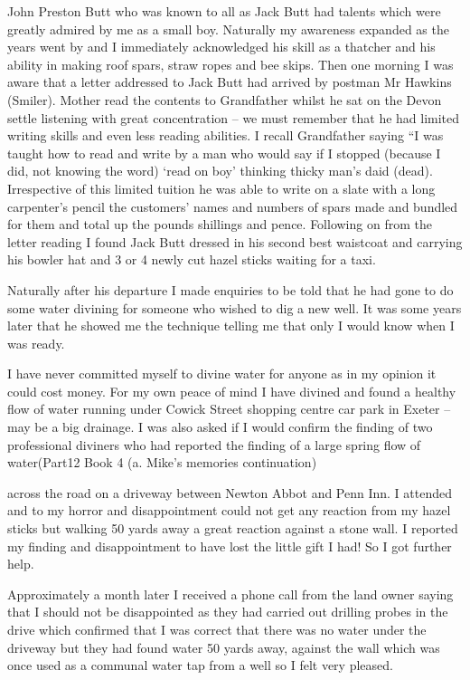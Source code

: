 John Preston Butt who was known to all as Jack Butt had talents which were
greatly admired by me as a small boy.   Naturally my awareness expanded as the
years went by and I immediately acknowledged his skill as a thatcher and his
ability in making roof spars, straw ropes and bee skips.  Then one morning I
was aware that a letter addressed to Jack Butt had arrived by postman Mr
Hawkins (Smiler).  Mother read the contents to Grandfather whilst he sat on the
Devon settle listening with great concentration – we must remember that he had
limited writing skills and even less reading abilities.  I recall Grandfather
saying ``I was taught how to read and write by a man who would say if I
stopped (because I did, not knowing the word) ‘read on boy' thinking thicky
man's daid (dead).  Irrespective of this limited tuition he was able to write
on a slate with a long carpenter's pencil the customers' names and numbers of
spars made and bundled for them and total up the pounds shillings and pence.
Following on from the letter reading I found Jack Butt dressed in his second
best waistcoat and carrying his bowler hat and 3 or 4 newly cut hazel sticks
waiting for a taxi.

Naturally after his departure I made enquiries to be told that he had gone to do
some water divining for someone who wished to dig a new well.  It was some
years later that he showed me the technique telling me that only I would know
when I was ready.

I have never committed myself to divine water for anyone as in my opinion it
could cost money.  For my own peace of mind I have divined and found a healthy
flow of water running under Cowick Street shopping centre car park in Exeter –
may be a big drainage. I was also asked if I would confirm the finding of two
professional diviners who had reported the finding of a large spring flow of
water(Part12 Book 4 (a. Mike's memories continuation)

across the road on a driveway between Newton Abbot and Penn Inn.  I attended and
to my horror and disappointment could not get any reaction from my hazel sticks
but walking 50 yards away a great reaction against a stone wall.  I reported my
finding and disappointment to have lost the little gift I had!  So I got
further help.

Approximately a month later I received a phone call from the land owner saying
that I should not be disappointed as they had carried out drilling probes in
the drive which confirmed that I was correct that there was no water under the
driveway but they had found water 50 yards away, against the wall which was
once used as a communal water tap from a well so I felt very pleased.

